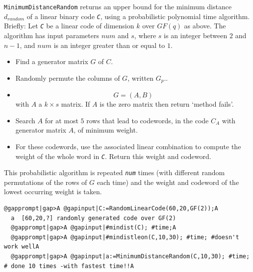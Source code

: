 \documentclass[a4paper,11pt]{report}
\begin{document}
{{{ \texttt{MinimumDistanceRandom} returns an upper bound for the minimum distance $d_{random}$ of a linear binary code \mbox{\texttt{\mdseries\slshape C}}, using a probabilistic polynomial time algorithm. Briefly: Let \mbox{\texttt{\mdseries\slshape C}} be a linear code of dimension $k$ over $GF(q)$ as above. The algorithm has input parameters $num$ and $s$, where $s$ is an integer between $2$ and $n-1$, and $num$ is an integer greater than or equal to $1$. 
\begin{itemize}
\item  Find a generator matrix $G$ of $C$. 
\item  Randomly permute the columns of $G$, written $G_p$.. 
\item  
\[ G=(A, B) \]
 with $A$ a $k\times s$ matrix. If $A$ is the zero matrix then return `method fails'. 
\item  Search $A$ for at most $5$ rows that lead to codewords, in the code $C_A$ with generator matrix $A$, of minimum weight. 
\item  For these codewords, use the associated linear combination to compute the
weight of the whole word in \mbox{\texttt{\mdseries\slshape C}}. Return this weight and codeword. 
\end{itemize}
 This probabilistic algorithm is repeated \mbox{\texttt{\mdseries\slshape num}} times (with different random permutations of the rows of $G$ each time) and the weight and codeword of the lowest occurring weight is
taken. }

 
\begin{Verbatim}[commandchars=@|A,fontsize=\small,frame=single,label=Example]
  @gapprompt|gap>A @gapinput|C:=RandomLinearCode(60,20,GF(2));A
  a  [60,20,?] randomly generated code over GF(2)
  @gapprompt|gap>A @gapinput|#mindist(C); #time;A
  @gapprompt|gap>A @gapinput|#mindistleon(C,10,30); #time; #doesn't work wellA
  @gapprompt|gap>A @gapinput|a:=MinimumDistanceRandom(C,10,30); #time; # done 10 times -with fastest time!!A
  

\end{Verbatim}}}
\end{document}

